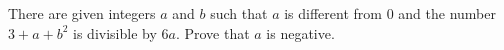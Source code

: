 There are given integers $a$ and $b$ such that $a$ is different from $0$ and the number $3+ a +b^2$ is divisible by $6a$. Prove that $a$ is negative.